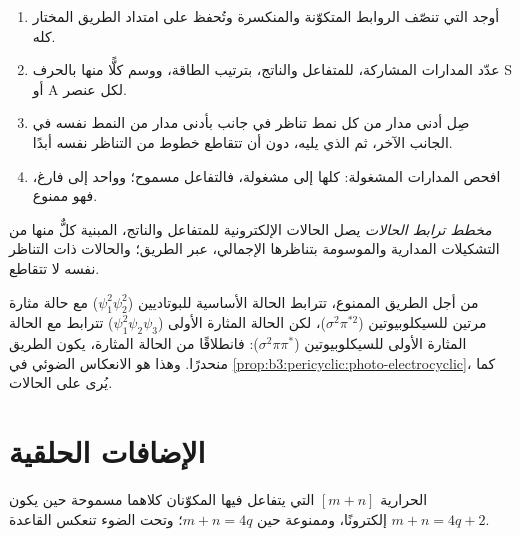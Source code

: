 \begin{method}\label{met:b3:pericyclic:correlation-diagram}
\begin{enumerate}
  \item أوجد  التي تنصّف الروابط المتكوّنة والمنكسرة 
        وتُحفظ على امتداد الطريق المختار كله.
  \item عدّد المدارات المشاركة، للمتفاعل والناتج، بترتيب
        الطاقة، ووسم كلًّا منها بالحرف S أو A لكل عنصر.
  \item صِل أدنى مدار من كل نمط تناظر في جانب بأدنى مدار من
        النمط نفسه في الجانب الآخر، ثم الذي يليه، دون أن تتقاطع خطوط من
        التناظر نفسه أبدًا.
  \item افحص المدارات المشغولة: كلها إلى مشغولة، فالتفاعل مسموح؛ وواحد إلى فارغ،
        فهو ممنوع.
\end{enumerate}
\end{method}

\begin{definition}\label{def:b3:pericyclic:state-correlation}
\emph{مخطط ترابط الحالات} يصل
الحالات الإلكترونية للمتفاعل والناتج، المبنية كلٌّ منها من التشكيلات
المدارية والموسومة بتناظرها الإجمالي، عبر الطريق؛ والحالات ذات
التناظر نفسه لا تتقاطع.
\end{definition}

من أجل الطريق  الممنوع، تترابط الحالة الأساسية للبوتاديين ($\psi_1^2\psi_2^2$)
مع حالة مثارة مرتين للسيكلوبيوتين ($\sigma^2\pi^{*2}$)، لكن الحالة المثارة الأولى
($\psi_1^2\psi_2\psi_3$) تترابط مع الحالة المثارة الأولى للسيكلوبيوتين ($\sigma^2\pi\pi^*$): فانطلاقًا من
الحالة المثارة، يكون الطريق  منحدرًا. وهذا هو الانعكاس الضوئي
في \cref{prop:b3:pericyclic:photo-electrocyclic}، كما يُرى على الحالات.

\section{الإضافات الحلقية}

\begin{theorem}\label{thm:b3:pericyclic:cycloaddition}
 الحرارية $[m + n]$ التي يتفاعل فيها المكوّنان كلاهما 
مسموحة حين يكون $m + n = 4q + 2$ إلكترونًا، وممنوعة حين $m + n = 4q$؛ وتحت الضوء تنعكس
القاعدة.
\end{theorem}


